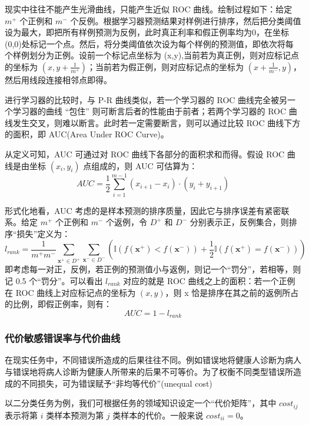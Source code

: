现实中往往不能产生光滑曲线，只能产生近似 ROC 曲线。绘制过程如下：给定 $m^{+}$ 个正例和 $m^{-}$ 个反例。根据学习器预测结果对样例进行排序，然后把分类阈值设为最大，即把所有样例预测为反例，此时真正利率和假正例率均为0，在坐标(0,0)处标记一个点。然后，将分类阈值依次设为每个样例的预测值，即依次将每个样例划分为正例。设前一个标记点坐标为 (x,y),当前若为真正例，则对应标记点的坐标为 $(x,y+\frac{1}{m^+})$；当前若为假正例，则对应标记点的坐标为 $(x+\frac{1}{m^-},y)$，然后用线段连接相邻点即得。

进行学习器的比较时，与 P-R 曲线类似，若一个学习器的 ROC 曲线完全被另一个学习器的曲线 ``包住'' 则可断言后者的性能由于前者；若两个学习器的 ROC 曲线发生交叉，则难以断言。此时若一定需要断言，则可以通过比较 ROC 曲线下方的面积，即 AUC(Area Under ROC Curve)。

从定义可知，AUC 可通过对 ROC 曲线下各部分的面积求和而得。假设 ROC 曲线是由坐标 $(x_i,y_i)$ 点组成的，则 AUC 可估算为：
\begin{equation}
    AUC = \frac{1}{2}\sum_{i=1}^{m-1}(x_{i+1}-x_i)\cdot(y_i+y_{i+1})
\end{equation}

形式化地看，AUC 考虑的是样本预测的排序质量，因此它与排序误差有紧密联系。给定 $m^+$ 个正例和 $m^-$ 个返例，令 $D^+$ 和 $D^-$ 分别表示正，反例集合，则排序``损失''定义为：
\begin{equation}
    l_{rank} = \frac{1}{m^+ m^-}\sum_{\mathbf{x}^+ \in D^+} \sum_{\mathbf{x}^- \in D^-} \left(\mathbb{I}(f(\mathbf{x}^+)<f(\mathbf{x}^-)) + \frac{1}{2} \mathbb{I} (f(\mathbf{x}^+)=f(\mathbf{x}^-)) \right)
\end{equation}
即考虑每一对正，反例，若正例的预测值小与返例，则记一个``罚分''，若相等，则记 0.5 个``罚分''。可以看出 $l_{rank}$ 对应的就是 ROC 曲线之上的面积：若一个正例在 ROC 曲线上对应标记点的坐标为 $(x,y)$，则 x 恰是排序在其之前的返例所占的比例，即假正例率，则有：
\begin{equation}
    AUC = 1 - l_{rank}
\end{equation}

\subsubsection{代价敏感错误率与代价曲线}
在现实任务中，不同错误所造成的后果往往不同。例如错误地将健康人诊断为病人与错误地将病人诊断为健康人所带来的后果不可等价。为了权衡不同类型错误所造成的不同损失，可为错误赋予``非均等代价''(unequal cost)

以二分类任务为例，我们可根据任务的领域知识设定一个``代价矩阵''，其中 $cost_{ij}$ 表示将第 $i$ 类样本预测为第 $j$ 类样本的代价。一般来说 $cost_{ii}=0$。

